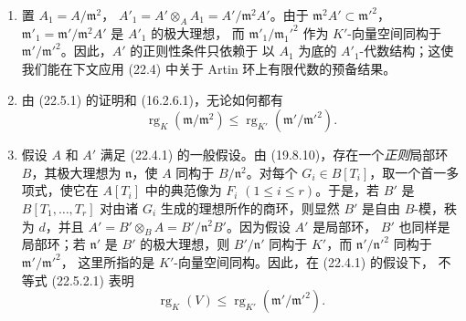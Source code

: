 \begin{remark}[22.5.2]
\label{0.22.5.2-fr}
\begin{enumerate}
  \item[\rm(i)] 置 $A_1=A/\mathfrak m^2$，
  $A'_1=A'\otimes_AA_1=A'/\mathfrak m^2A'$。由于
  $\mathfrak m^2A'\subset\mathfrak m'^2$，
  $\mathfrak m'_1=\mathfrak m'/\mathfrak m^2A'$ 是 $A'_1$ 的极大理想，
  而 $\mathfrak m'_1/\mathfrak m_1'^2$ 作为 $K'$-向量空间同构于
  $\mathfrak m'/\mathfrak m'^2$。因此，$A'$ 的正则性条件只依赖于
  以 $A_1$ 为底的 $A'_1$-代数结构；这使我们能在下文应用 (22.4) 中关于
  Artin 环上有限代数的预备结果。
  \item[\rm(ii)] 由 (22.5.1) 的证明和 (16.2.6.1)，无论如何都有
  \begin{equation}
  \label{0.22.5.2.1-fr}
    \operatorname{rg}_K(\mathfrak m/\mathfrak m^2)
    \leqslant\operatorname{rg}_{K'}(\mathfrak m'/\mathfrak m'^2).
    \tag{22.5.2.1}
  \end{equation}


  \item[\rm(iii)] 假设 $A$ 和 $A'$ 满足 (22.4.1) 的一般假设。由
  (19.8.10)，存在一个\emph{正则}局部环 $B$，其极大理想为
  $\mathfrak n$，使 $A$ 同构于 $B/\mathfrak n^2$。对每个
  $G_i\in B[T_i]$，取一个首一多项式，使它在 $A[T_i]$ 中的典范像为
  $F_i$ $(1\leqslant i\leqslant r)$。于是，若 $B'$ 是
  $B[T_1,\ldots,T_r]$ 对由诸 $G_i$ 生成的理想所作的商环，则显然
  $B'$ 是自由 $B$-模，秩为 $d$，并且
  $A'=B'\otimes_BA=B'/\mathfrak n^2B'$。因为假设 $A'$ 是局部环，
  $B'$ 也同样是局部环；若 $\mathfrak n'$ 是 $B'$ 的极大理想，则
  $B'/\mathfrak n'$ 同构于 $K'$，而
  $\mathfrak n'/\mathfrak n'^2$ 同构于 $\mathfrak m'/\mathfrak m'^2$，
  这里所指的是 $K'$-向量空间同构。因此，在 (22.4.1) 的假设下，
  不等式 (22.5.2.1) 表明
  \begin{equation}
  \label{0.22.5.2.2-fr}
    \operatorname{rg}_K(V)\leqslant\operatorname{rg}_{K'}(\mathfrak m'/\mathfrak m'^2).
    \tag{22.5.2.2}
  \end{equation}
\end{enumerate}
\end{remark}

